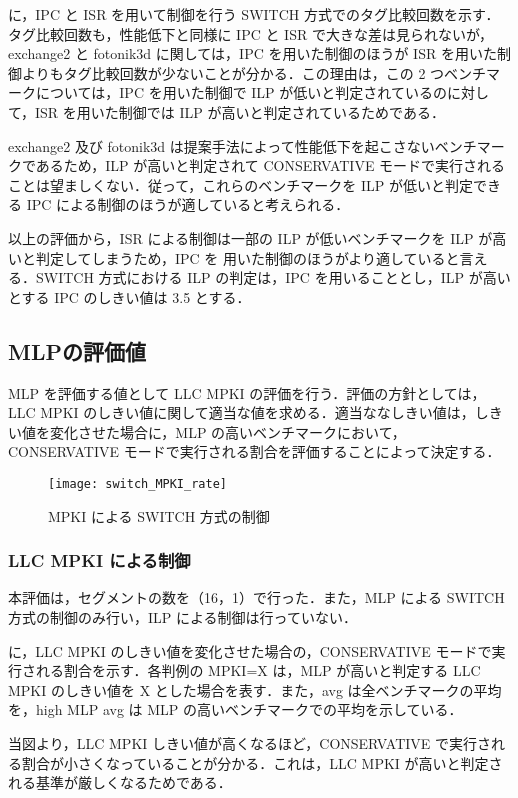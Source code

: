 に，IPC と ISR を用いて制御を行う SWITCH 方式でのタグ比較回数を示す．タグ比較回数も，性能低下と同様に IPC と ISR で大きな差は見られないが，exchange2 と fotonik3d に関しては，IPC を用いた制御のほうが ISR を用いた制御よりもタグ比較回数が少ないことが分かる．この理由は，この 2 つベンチマークについては，IPC を用いた制御で ILP が低いと判定されているのに対して，ISR を用いた制御では ILP が高いと判定されているためである．

exchange2 及び fotonik3d は提案手法によって性能低下を起こさないベンチマークであるため，ILP が高いと判定されて CONSERVATIVE モードで実行されることは望ましくない．従って，これらのベンチマークを ILP が低いと判定できる IPC による制御のほうが適していると考えられる．

以上の評価から，ISR による制御は一部の ILP が低いベンチマークを ILP が高いと判定してしまうため，IPC を 用いた制御のほうがより適していると言える．SWITCH 方式における ILP の判定は，IPC を用いることとし，ILP が高いとする IPC のしきい値は 3.5 とする．

\subsection{MLPの評価値}
MLP を評価する値として LLC MPKI の評価を行う．評価の方針としては，LLC MPKI のしきい値に関して適当な値を求める．適当ななしきい値は，しきい値を変化させた場合に，MLP の高いベンチマークにおいて，CONSERVATIVE モードで実行される割合を評価することによって決定する．

\begin{figure}[htb]
  \centering
  \texttt{[image: switch\_MPKI\_rate]}
  \caption{MPKI による SWITCH 方式の制御}
  \label{fig:switch_MPKI_rate}
\end{figure}

\subsubsection{LLC MPKI による制御}
本評価は，セグメントの数を（16，1）で行った．また，MLP による SWITCH 方式の制御のみ行い，ILP による制御は行っていない．

に，LLC MPKI のしきい値を変化させた場合の，CONSERVATIVE モードで実行される割合を示す．各判例の MPKI=X は，MLP が高いと判定する LLC MPKI のしきい値を X とした場合を表す．また，avg は全ベンチマークの平均を，high MLP avg は MLP の高いベンチマークでの平均を示している． 

当図より，LLC MPKI しきい値が高くなるほど，CONSERVATIVE で実行される割合が小さくなっていることが分かる．これは，LLC MPKI が高いと判定される基準が厳しくなるためである．

